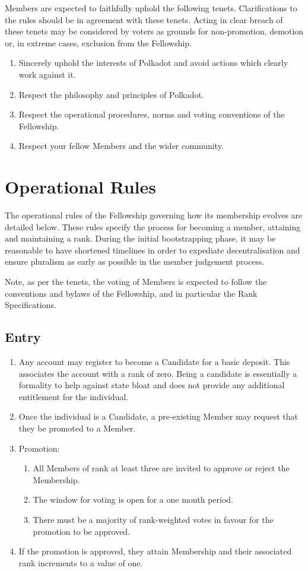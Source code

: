 \documentclass[9pt,oneside]{amsart}
\begin{document}
Members are expected to faithfully uphold the following tenets. Clarifications to the rules should be in agreement with these tenets. Acting in clear breach of these tenets may be considered by voters as grounds for non-promotion, demotion or, in extreme cases, exclusion from the Fellowship.

\begin{enumerate}
\item Sincerely uphold the interests of Polkadot and avoid actions which clearly work against it.
\item Respect the philosophy and principles of Polkadot.
\item Respect the operational procedures, norms and voting conventions of the Fellowship.
\item Respect your fellow Members and the wider community.
\end{enumerate}

\section{Operational Rules}\label{operational-rules}

The operational rules of the Fellowship governing how its membership evolves are detailed below. These rules specify the process for becoming a member, attaining and maintaining a rank. During the initial bootstrapping phase, it may be reasonable to have shortened timelines in order to expediate decentralisation and ensure pluralism as early as possible in the member judgement process.

Note, as per the tenets, the voting of Members is expected to follow the conventions and bylaws of the Fellowship, and in particular the Rank Specifications.

\subsection{Entry}

\begin{enumerate}
\item Any account may register to become a Candidate for a basic deposit. This associates the account with a rank of zero. Being a candidate is essentially a formality to help against state bloat and does not provide any additional entitlement for the individual.
\item Once the individual is a Candidate, a pre-existing Member may request that they be promoted to a Member.
\item Promotion:
  \begin{enumerate}
    \item All Members of rank at least three are invited to approve or reject the Membership.
    \item The window for voting is open for a one month period.
    \item There must be a majority of rank-weighted votes in favour for the promotion to be approved.
  \end{enumerate}
\item If the promotion is approved, they attain Membership and their associated rank increments to a value of one.
\end{enumerate}
\end{document}
